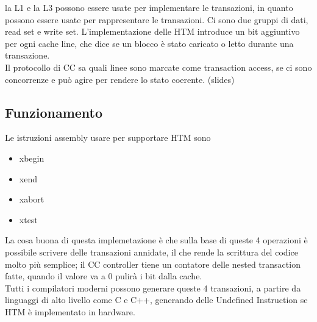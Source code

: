 \documentclass[12pt, oneside]{extbook} %
\begin{document}
la L1 e la L3 possono essere usate per implementare le transazioni, in quanto possono essere usate per rappresentare le transazioni. Ci sono due gruppi di dati, read set e write set. L'implementazione delle HTM introduce un bit aggiuntivo per ogni cache line, che dice se un blocco è stato caricato o letto durante una transazione.\\ Il protocollo di CC sa quali linee sono marcate come transaction access, se ci sono concorrenze e può agire per rendere lo stato coerente. (slides)
\subsection{Funzionamento}
Le istruzioni assembly usare per supportare HTM sono
\begin{itemize}
\item \textsf{xbegin}
\item \textsf{xend}
\item \textsf{xabort}
\item \textsf{xtest}
\end{itemize}
La cosa buona di questa implemetazione è che sulla base di queste 4 operazioni è possibile scrivere delle transazioni annidate, il che rende la scrittura del codice molto più semplice; il CC controller tiene un contatore delle nested transaction fatte, quando il valore va a 0 pulirà i bit dalla cache.\\ Tutti i compilatori moderni possono generare queste 4 transazioni, a partire da linguaggi di alto livello come C e C++, generando delle Undefined Instruction se HTM è implementato in hardware.\\
\end{document}
